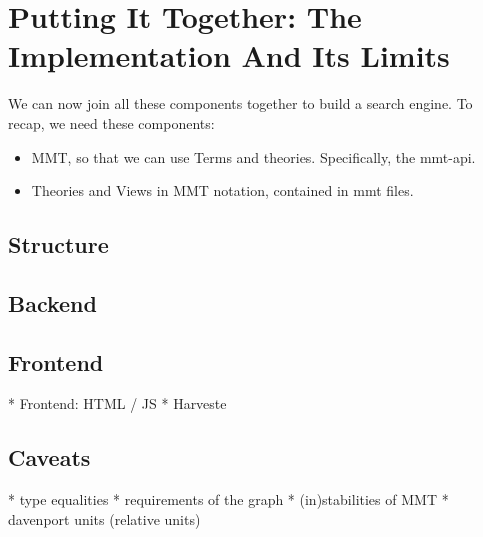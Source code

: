 \section{Putting It Together: The Implementation And Its Limits}
\label{sec:pit}

We can now join all these components together to build a search engine. To recap, we need these components:
\begin{itemize}
  \item MMT, so that we can use Terms and theories. Specifically, the mmt-api.
  \item Theories and Views in MMT notation, contained in mmt files.
\end{itemize}
\subsection{Structure}


\subsection{Backend}
\subsection{Frontend}
\label{sec:frontend}
* Frontend: HTML / JS
* Harveste
\subsection{Caveats}
* type equalities
* requirements of the graph
* (in)stabilities of MMT
* davenport units (relative units)
